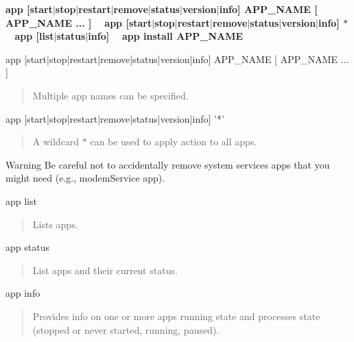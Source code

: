 {\bfseries {\ttfamily app \mbox{[}start$\vert$stop$\vert$restart$\vert$remove$\vert$status$\vert$version$\vert$info\mbox{]} A\+P\+P\+\_\+\+N\+A\+M\+E \mbox{[} A\+P\+P\+\_\+\+N\+A\+M\+E ... \mbox{]} ~\newline
 app \mbox{[}start$\vert$stop$\vert$restart$\vert$remove$\vert$status$\vert$version$\vert$info\mbox{]} \textquotesingle{}$\ast$\textquotesingle{} ~\newline
 app \mbox{[}list$\vert$status$\vert$info\mbox{]} ~\newline
 app install A\+P\+P\+\_\+\+N\+A\+M\+E ~\newline
 }}

\begin{DoxyVerb}app [start|stop|restart|remove|status|version|info] APP_NAME [ APP_NAME ... ]\end{DoxyVerb}
 \begin{quote}
Multiple app names can be specified. \end{quote}


\begin{DoxyVerb}app [start|stop|restart|remove|status|version|info] '*'\end{DoxyVerb}
 \begin{quote}
A wildcard \textquotesingle{}$\ast$\textquotesingle{} can be used to apply action to all apps. \end{quote}


\begin{DoxyWarning}{Warning}
Be careful not to accidentally remove system services apps that you might need (e.\+g., modem\+Service app).
\end{DoxyWarning}
\begin{DoxyVerb}app list\end{DoxyVerb}
 \begin{quote}
Lists apps. \end{quote}


\begin{DoxyVerb}app status\end{DoxyVerb}
 \begin{quote}
List apps and their current status. \end{quote}


\begin{DoxyVerb}app info \end{DoxyVerb}
 \begin{quote}
Provides info on one or more apps\textquotesingle{} running state and processes\textquotesingle{} state (stopped or never started, running, paused). \end{quote}


